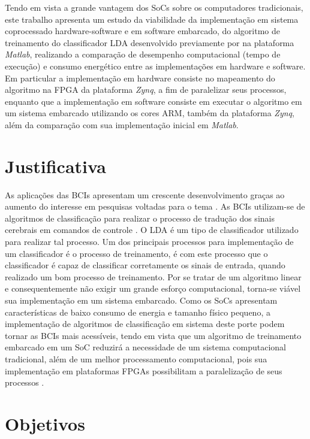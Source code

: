 Tendo em vista a grande vantagem dos SoCs sobre os computadores tradicionais, este trabalho apresenta um estudo da viabilidade da implementação em sistema coprocessado hardware-software e em software embarcado, do algoritmo de treinamento do classificador LDA desenvolvido previamente por \cite{F.Lotte} na plataforma \textit{Matlab}, realizando a comparação de desempenho computacional (tempo de execução) e consumo energético entre as implementações em hardware e software. Em particular a implementação em hardware consiste no mapeamento do algoritmo na FPGA da plataforma \textit{Zynq}, a fim de paralelizar seus processos, enquanto que a implementação em software consiste em executar o algoritmo em um sistema embarcado utilizando os cores ARM, também da plataforma \textit{Zynq}, além da comparação com sua implementação inicial em \textit{Matlab}.


\section{Justificativa}
As aplicações das BCIs apresentam um crescente desenvolvimento  graças ao aumento do interesse em pesquisas voltadas para o tema \cite{BCICompetition}. As BCIs utilizam-se de algoritmos de classificação para realizar o processo de tradução dos sinais cerebrais em comandos de controle \cite{MasonAndBirch}. O LDA é um tipo de classificador utilizado para realizar tal processo. Um dos principais processos para implementação de um classificador é o processo de treinamento, é com este processo que o classificador é capaz de classificar corretamente os sinais de entrada, quando realizado um bom processo de treinamento\cite{F.Lotte}. Por se tratar de um algoritmo linear e consequentemente não exigir um grande esforço computacional, torna-se viável sua implementação em um sistema embarcado. Como os SoCs apresentam características de baixo consumo de energia e tamanho físico pequeno, a implementação de algoritmos de classificação em sistema deste porte podem tornar as BCIs mais acessíveis, tendo em vista que um algoritmo de treinamento embarcado em um SoC reduzirá a necessidade de um sistema computacional tradicional, além de um melhor processamento computacional, pois sua implementação em plataformas FPGAs possibilitam a paralelização de seus processos \cite{zynqBook}.

\section{Objetivos}

